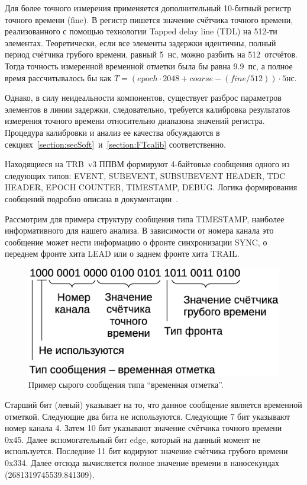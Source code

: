 Для более точного измерения применяется дополнительный 10-битный регистр точного времени (fine). В регистр пишется значение счётчика точного времени, реализованного с помощью технологии Tapped delay line (TDL) на 512-ти элементах. Теоретически, если все элементы задержки идентичны, полный период счётчика грубого времени, равный 5~нс, можно разбить на 512~отсчётов. Тогда точность измеренной временной отметки была бы равна 9.9~пс, а полное время рассчитывалось бы как $ T = (epoch \cdot 2048 + coarse - (fine/512)) \cdot 5 $нс.

Однако, в силу неидеальности компонентов, существует разброс параметров элементов в линии задержки, следовательно, требуется калибровка результатов измерения точного времени относительно диапазона значений регистра. Процедура калибровки и анализ ее качества обсуждаются в секциях~\ref{section:secSoft}~и~\ref{section:FTcalib} соответственно.

Находящиеся на TRB~v3 ППВМ формируют 4-байтовые сообщения одного из следующих типов: EVENT, SUBEVENT, SUBSUBEVENT HEADER, TDC HEADER, EPOCH COUNTER, TIMESTAMP, DEBUG. Логика формирования сообщений подробно описана в документации~\cite{TRBDOCU}.

Рассмотрим для примера структуру сообщения типа TIMESTAMP, наиболее информативного для нашего анализа. В зависимости от номера канала это сообщение может нести информацию о фронте синхронизации SYNC, о переднем фронте хита LEAD или о заднем фронте хита TRAIL.

\begin{figure}
\includegraphics[width=1.0\textwidth]{pictures/8_Unpacking.eps}
\caption{Пример сырого сообщения типа ``временная отметка''.}
\label{fig:Unpacking}
\end{figure}

Старший бит (левый) указывает на то, что данное сообщение является временной отметкой. Следующие два бита не используются. Следующие 7 бит указывают номер канала 4. Затем 10 бит указывают значение счётчика точного времени 0x45. Далее вспомогательный бит edge, который на данный момент не используется. Последние 11 бит кодируют значение счётчика грубого времени 0x334. Далее отсюда вычисляется полное значение времени в наносекундах (2681319745539.841309).

